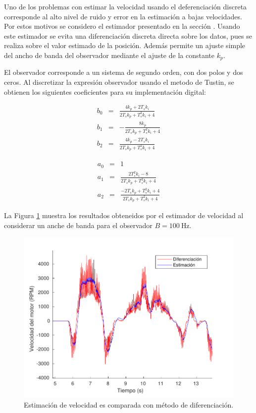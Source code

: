 Uno de los problemas con estimar la velocidad usando el deferenciación discreta corresponde al alto nivel de ruido y error en la estimación a bajas velocidades. Por estos motivos se considero el estimador presentado en la sección . Usando este estimador se evita una diferenciación discreta directa sobre los datos, pues se realiza sobre el valor estimado de la posición. Además permite un ajuste simple del ancho de banda del observador mediante el ajuste de la constante $k_p$.

El observador corresponde a un sistema de segundo orden, con dos polos y dos ceros. Al discretizar la expresión observador usando el metodo de Tustin, se obtienen los siguientes coeficientes para su implementación digital:

\begin{eqnarray}
b_0 &=& \frac{4 k_p + 2 T_s k_i}{2 T_s k_p + T_s^2 k_i + 4} \\
b_1 &=& -\frac{ 8 k_p}{2 T_s k_p + T_s^2 k_i + 4}\\
b_2 &=& \frac{4 k_p - 2 T_s k_i}{2 T_s k_p + T_s^2 k_i + 4}
\end{eqnarray}

\begin{eqnarray}
a_0 &=& 1 \\
a_1 &=& \frac{ 2 T_s^2 k_i - 8}{2 T_s k_p + T_s^2 k_i + 4}\\
a_2 &=& \frac{-2 T_s k_p  + T_s^2 k_i + 4}{2 T_s k_p + T_s^2 k_i + 4}
\end{eqnarray}

La Figura \ref{cap4_est_velocidad} muestra los resultados obteneidos por el estimador de velocidad al considerar un anche de banda para el observador $B = \SI{100}{\hertz}$.

\begin{figure}[ht]
  \centering
  \includegraphics[scale=0.6]{img/cap4/velocidad_estimacion}
  \caption{Estimación de velocidad es comparada con método de diferenciación.}
  \label{cap4_est_velocidad}
\end{figure}

